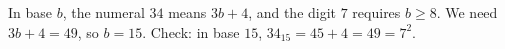 In base $b$, the numeral $34$ means $3b+4$, and the digit $7$ requires $b\ge8$. We need $3b+4=49$, so $b=\boxed{15}$. Check: in base $15$, $34_{15}=45+4=49=7^2$.
